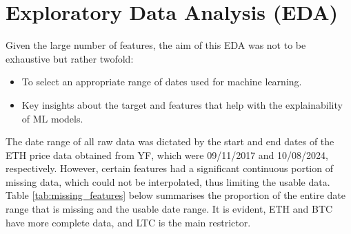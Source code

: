 \documentclass[ %
                    author={Raj Dhakan},
                supervisor={Dr. Ayush Joshi},
                    degree={MSc},
                     title={Ethereum Price Prediction using Internal and External Factors},
                  subtitle={},
                      type={},
                      year={2025}]{dissertation}
\begin{document}
\section{Exploratory Data Analysis (EDA)}
\label{sec:eda}
Given the large number of features, the aim of this EDA was not to be exhaustive but rather twofold:
\begin{itemize}
    \item To select an appropriate range of dates used for machine learning.
    \item Key insights about the target and features that help with the explainability of ML models.
\end{itemize}

The date range of all raw data was dictated by the start and end dates of the ETH price data obtained from YF, which were 09/11/2017 and 10/08/2024, respectively. However, certain features had a significant continuous portion of missing data, which could not be interpolated, thus limiting the usable data. Table \ref{tab:missing_features} below summarises the proportion of the entire date range that is missing and the usable date range. It is evident, ETH and BTC have more complete data, and LTC is the main restrictor.
\end{document}
